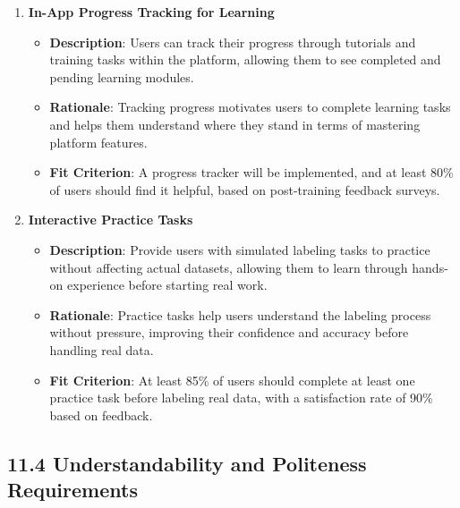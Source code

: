 \documentclass[12pt]{article}
\begin{document}
\begin{enumerate}
    \item \textbf{In-App Progress Tracking for Learning}  
        \begin{itemize}[leftmargin=2cm]
            \item \textbf{Description}: Users can track their progress through tutorials and training tasks within the platform, allowing them to see completed and pending learning modules.  
            \item \textbf{Rationale}: Tracking progress motivates users to complete learning tasks and helps them understand where they stand in terms of mastering platform features.  
            \item \textbf{Fit Criterion}: A progress tracker will be implemented, and at least 80\% of users should find it helpful, based on post-training feedback surveys.
        \end{itemize}
    \item \textbf{Interactive Practice Tasks}  
        \begin{itemize}[leftmargin=2cm]
            \item \textbf{Description}: Provide users with simulated labeling tasks to practice without affecting actual datasets, allowing them to learn through hands-on experience before starting real work.  
            \item \textbf{Rationale}: Practice tasks help users understand the labeling process without pressure, improving their confidence and accuracy before handling real data.  
            \item \textbf{Fit Criterion}: At least 85\% of users should complete at least one practice task before labeling real data, with a satisfaction rate of 90\% based on feedback.
        \end{itemize}
\end{enumerate}

\subsection*{11.4 Understandability and Politeness Requirements}
\end{document}
